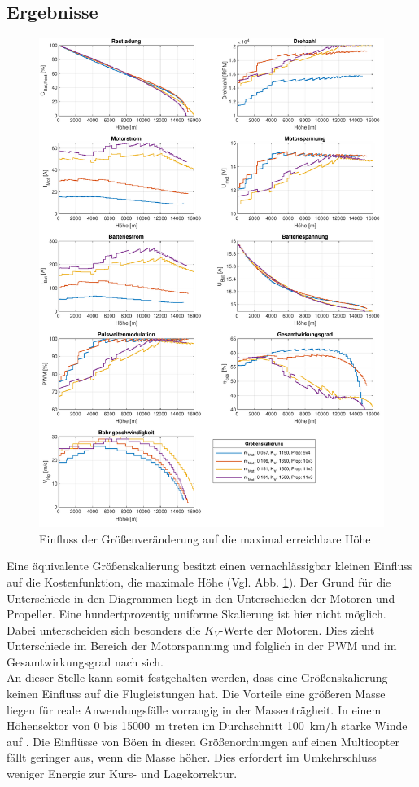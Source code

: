\subsection{Ergebnisse}
\label{subsec:ergebnisse_groesse}

\begin{figure}[H]
	\includegraphics[scale=0.7]{Diagramme/Groessenskalierung.pdf}
	\caption{Einfluss der Größenveränderung auf die maximal erreichbare Höhe}
	\label{abb:groessenskalierung}
\end{figure}
Eine äquivalente Größenskalierung besitzt einen vernachlässigbar kleinen Einfluss auf die Kostenfunktion, die maximale Höhe (Vgl. Abb. \ref{abb:groessenskalierung}). Der Grund für die Unterschiede in den Diagrammen liegt in den Unterschieden der Motoren und Propeller. Eine hundertprozentig uniforme Skalierung ist hier nicht möglich. Dabei unterscheiden sich besonders die \ensuremath{K_V}-Werte der Motoren. Dies zieht Unterschiede im Bereich der Motorspannung und folglich in der PWM und im Gesamtwirkungsgrad nach sich. \\
An dieser Stelle kann somit festgehalten werden, dass eine Größenskalierung keinen Einfluss auf die Flugleistungen hat. Die Vorteile eine größeren Masse liegen für reale Anwendungsfälle vorrangig in der Massenträgheit. In einem Höhensektor von \SI{0}{} bis \SI{15000}{m} treten im Durchschnitt \SI{100}{km/h} starke Winde auf \cite{Seidel.2011}. 
Die Einflüsse von Böen in diesen Größenordnungen auf einen Multicopter fällt geringer aus, wenn die Masse höher. Dies erfordert im Umkehrschluss weniger Energie zur Kurs- und Lagekorrektur.


